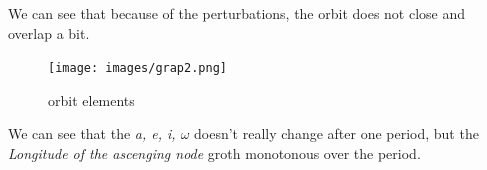 \documentclass[11pt, a4paper]{article}
\begin{document}
\noindent We can see that because of the perturbations, the orbit does not close and overlap a bit.
\begin{figure}[H]
    \begin{center}
    \texttt{[image: images/grap2.png]}
    \caption{orbit elements}
    \end{center}
\end{figure}
We can see that the \emph{a, e, i, $\omega$} doesn't really change after one period, but the \emph{Longitude of the ascenging node} groth monotonous over the period.


\newpage


\end{document}
